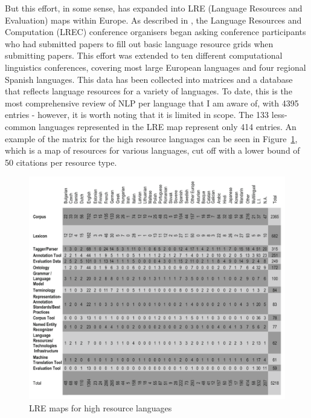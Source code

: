 But this effort, in some sense, has expanded into LRE (Language Resources and Evaluation) maps within Europe. As described in \citet{calzolari2010lrec, del2014lremap, mariani2015language, del2015visualising}, the Language Resources and Computation (LREC) conference organisers began asking conference participants who had submitted papers to fill out basic language resource grids when submitting papers. This effort was extended to ten different computational linguistics conferences, covering most large European languages and four regional Spanish languages. This data has been collected into matrices and a database that reflects language resources for a variety of languages. To date, this is the most comprehensive review of NLP per language that I am aware of, with 4395 entries - however, it is worth noting that it is limited in scope. The 133 less-common languages represented in the LRE map represent only 414 entries. An example of the matrix for the high resource languages can be seen in Figure~\ref{fig:lre}, which is a map of resources for various languages, cut off with a lower bound of 50 citations per resource type.

\begin{figure}
 \centering
 \includegraphics[width=1\textwidth]{img/lre.png}
 \caption{LRE maps for high resource languages \citep[460]{mariani2015language}}
 \label{fig:lre}
\end{figure}

